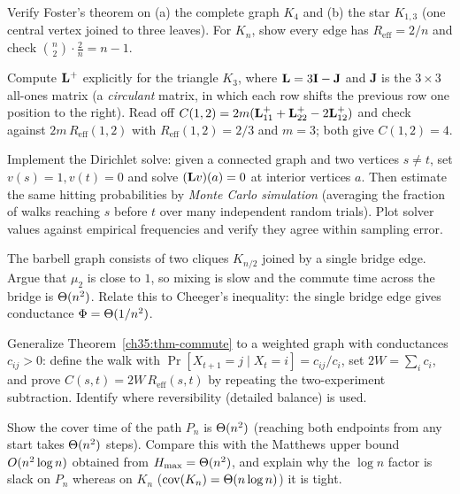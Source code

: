 \begin{exercise}
Verify Foster's theorem on (a) the complete graph $K_4$ and (b) the star $K_{1,3}$ (one central vertex joined to three leaves). For $K_n$, show every edge has $R_{\mathrm{eff}}=2/n$ and check $\binom n2\cdot\frac2n=n-1$.
\end{exercise}

\begin{exercise}
Compute $\mathbf{L}^+$ explicitly for the triangle $K_3$, where $\mathbf{L} = 3\mathbf{I}-\mathbf{J}$ and $\mathbf{J}$ is the $3\times 3$ all-ones matrix (a \emph{circulant} matrix, in which each row shifts the previous row one position to the right). Read off $C(1,2)=2m(\mathbf{L}^+_{11}+\mathbf{L}^+_{22}-2\mathbf{L}^+_{12})$ and check against $2m\,R_{\mathrm{eff}}(1,2)$ with $R_{\mathrm{eff}}(1,2)=2/3$ and $m=3$; both give $C(1,2)=4$.
\end{exercise}

\begin{exercise}[Harmonic = hitting probability, coded]
Implement the Dirichlet solve: given a connected graph and two vertices $s\ne t$, set $v(s)=1,v(t)=0$ and solve $(\mathbf{L} v)(a)=0$ at interior vertices $a$. Then estimate the same hitting probabilities by \emph{Monte Carlo simulation} (averaging the fraction of walks reaching $s$ before $t$ over many independent random trials). Plot solver values against empirical frequencies and verify they agree within sampling error.
\end{exercise}

\begin{exercise}
The barbell graph consists of two cliques $K_{n/2}$ joined by a single bridge edge. Argue that $\mu_2$ is close to $1$, so mixing is slow and the commute time across the bridge is $\Theta(n^2)$. Relate this to Cheeger's inequality: the single bridge edge gives conductance $\Phi=\Theta(1/n^2)$.
\end{exercise}

\begin{exercise}
Generalize Theorem~\ref{ch35:thm-commute} to a weighted graph with conductances $c_{ij}>0$: define the walk with $\Pr[X_{t+1}=j\mid X_t=i]=c_{ij}/c_i$, set $2W=\sum_i c_i$, and prove $C(s,t)=2W\,R_{\mathrm{eff}}(s,t)$ by repeating the two-experiment subtraction. Identify where reversibility (detailed balance) is used.
\end{exercise}

\begin{exercise}
Show the cover time of the path $P_n$ is $\Theta(n^2)$ (reaching both endpoints from any start takes $\Theta(n^2)$ steps). Compare this with the Matthews upper bound $O(n^2\log n)$ obtained from $H_{\max}=\Theta(n^2)$, and explain why the $\log n$ factor is slack on $P_n$ whereas on $K_n$ ($\operatorname{cov}(K_n)=\Theta(n\log n)$) it is tight.
\end{exercise}
